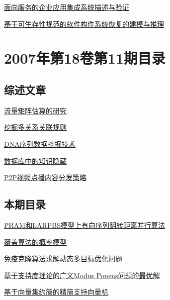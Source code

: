 \documentclass[a4paper]{article}
\begin{document}
\href{http://www.jos.org.cn/ch/reader/download_pdf.aspx?file_no=20071206&year_id=2007&quarter_id=12&falg=1}{面向服务的企业应用集成系统描述与验证}

\href{http://www.jos.org.cn/ch/reader/download_pdf.aspx?file_no=20071207&year_id=2007&quarter_id=12&falg=1}{基于可生存性规范的软件构件系统恢复的建模与推理}


\section{\textbf{2007年第18卷第11期目录}}
\subsection{综述文章}
\href{http://www.jos.org.cn/ch/reader/download_pdf.aspx?file_no=20071101&year_id=2007&quarter_id=11&falg=1}{流量矩阵估算的研究}

\href{http://www.jos.org.cn/ch/reader/download_pdf.aspx?file_no=20071109&year_id=2007&quarter_id=11&falg=1}{挖掘多关系关联规则}

\href{http://www.jos.org.cn/ch/reader/download_pdf.aspx?file_no=20071110&year_id=2007&quarter_id=11&falg=1}{DNA序列数据挖掘技术}

\href{http://www.jos.org.cn/ch/reader/download_pdf.aspx?file_no=20071111&year_id=2007&quarter_id=11&falg=1}{数据库中的知识隐藏}

\href{http://www.jos.org.cn/ch/reader/download_pdf.aspx?file_no=20071126&year_id=2007&quarter_id=11&falg=1}{P2P视频点播内容分发策略}

\subsection{本期目录}
\href{http://www.jos.org.cn/ch/reader/download_pdf.aspx?file_no=20071102&year_id=2007&quarter_id=11&falg=1}{PRAM和LARPBS模型上有向序列翻转距离并行算法}

\href{http://www.jos.org.cn/ch/reader/download_pdf.aspx?file_no=20071103&year_id=2007&quarter_id=11&falg=1}{覆盖算法的概率模型}

\href{http://www.jos.org.cn/ch/reader/download_pdf.aspx?file_no=20071104&year_id=2007&quarter_id=11&falg=1}{免疫克隆算法求解动态多目标优化问题}

\href{http://www.jos.org.cn/ch/reader/download_pdf.aspx?file_no=20071105&year_id=2007&quarter_id=11&falg=1}{基于支持度理论的广义Modus Ponens问题的最优解}

\href{http://www.jos.org.cn/ch/reader/download_pdf.aspx?file_no=20071106&year_id=2007&quarter_id=11&falg=1}{基于向量集约简的精简支持向量机}
\end{document}
